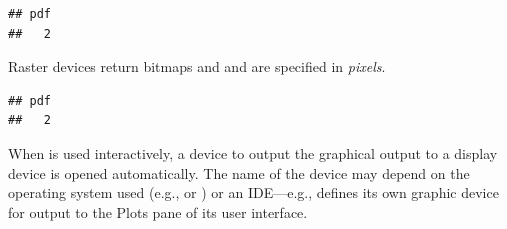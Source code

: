 \documentclass[krantz2]{krantz}\usepackage{knitr}
\begin{document}
\begin{knitrout}\footnotesize
{}\color{fgcolor}\begin{kframe}
\begin{alltt}
\hlstd{(} \hlstd{=} \hlstd{,}  \hlstd{=} \hlstd{,}  \hlstd{=} \hlstd{,}  \hlstd{=} \hlstd{)}
 \hlopt{~}   
 \hlopt{~}   
\hlstd{()}
\end{alltt}
\begin{verbatim}
## pdf 
##   2
\end{verbatim}
\end{kframe}
\end{knitrout}

Raster devices return bitmaps and  and  are specified in \emph{pixels}.

\begin{knitrout}\footnotesize
{}\color{fgcolor}\begin{kframe}
\begin{alltt}
\hlstd{(} \hlstd{=} \hlstd{,}  \hlstd{=} \hlstd{,}  \hlstd{=} \hlstd{)}
 \hlopt{~}   
\hlstd{()}
\end{alltt}
\begin{verbatim}
## pdf 
##   2
\end{verbatim}
\end{kframe}
\end{knitrout}

When \Rlang is used interactively, a device to output the graphical output to a display device is opened automatically. The name of the device may depend on the operating system used (e.g.,   or ) or an IDE---e.g.,  \RStudio defines its own graphic device for output to the Plots pane of its user interface.
\end{document}
